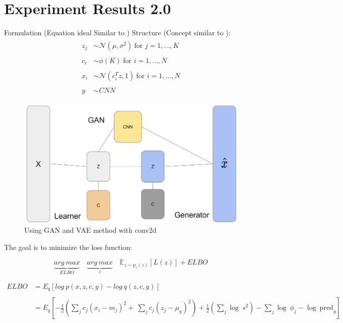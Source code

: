 \documentclass[12pt]{article}
\begin{document}
\section{Experiment Results 2.0}


Formulation (Equation ideal Similar to \cite{Blei2017}) Structure (Concept similar to \cite{Mescheder}):\\ 

\begin{align} 
  \begin{split}
z_j & \sim \mathcal{N}(\mu, \sigma^2)~\text{for } j = 1, ..., K \\\\
c_i & \sim \phi(K)~\text{for } i = 1, ..., N \\\\ 
x_i & \sim \mathcal{N}(c_i^T z, 1)~\text{for } i = 1, ..., N \\\\
y  & \sim CNN
  \end{split}
\end{align}

\begin{figure}[H]
    \centering
    \includegraphics[width=0.8\linewidth]{../fig/GAN-VI-model-v2.png} %
    \caption{Using GAN and VAE method with conv2d }
    \label{fig:GANandVAE_v2}
\end{figure}

The goal is to minimize the loss function:

$$ \underbrace{arg~max}_{ELBO} \quad \underbrace{arg~max}_{z}\quad \mathbb{E}_{z \sim p_z(z)} [L(z)] + ELBO $$

\begin{align*}
ELBO  &= E_q[log~p(x,z,c,y) - log~q(z,c,y)] \\ \\
&= E_{q}[-\frac{1}{2}( \sum_j c_{j}\left( x_{i}-m_{j} \right)^2+~\sum_{j}c_{j}\left( z_{j}-\mu_{y} \right)^2) + \frac{1}{2}\left(\sum_{j} \log~s^2  \right) - \sum_{j} \log~ \phi_{j} - \log~ \text{pred}_{y}] \\ \\
\end{align*}
\end{document}
